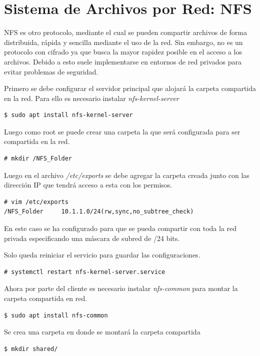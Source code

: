 \documentclass[12pt]{article}
\begin{document}
\section{Sistema de Archivos por Red: NFS}

NFS es otro protocolo, mediante el cual se pueden compartir archivos de forma distribuida, rápida y sencilla mediante el uso de la red. Sin embargo, no es un protocolo con cifrado ya que busca la mayor rapidez posible en el acceso a los archivos. Debido a esto suele implementarse en entornos de red privados para evitar problemas de seguridad. \cite{nfs}


Primero se debe configurar el servidor principal que alojará la carpeta compartida en la red. Para ello es necesario instalar \emph{nfs-kernel-server}

\begin{lstlisting}[frame=single]
$ sudo apt install nfs-kernel-server
\end{lstlisting}

Luego como root se puede crear una carpeta la que será configurada para ser compartida en la red.
\begin{lstlisting}[frame=single]
# mkdir /NFS_Folder
\end{lstlisting}

Luego en el archivo \emph{/etc/exports} se debe agregar la carpeta creada junto con las dirección IP que tendrá acceso a esta con los permisos. 
\begin{lstlisting}[frame=single]
# vim /etc/exports
/NFS_Folder		10.1.1.0/24(rw,sync,no_subtree_check)
\end{lstlisting}
En este caso se ha configurado para que se pueda compartir con toda la red privada especificando una máscara de subred de /24 bits.

Solo queda reiniciar el servicio para guardar las configuraciones.
\begin{lstlisting}[frame=single]
# systemctl restart nfs-kernel-server.service
\end{lstlisting}

Ahora por parte del cliente es necesario instalar \emph{nfs-common} para montar la carpeta compartida en red.
\begin{lstlisting}[frame=single]
$ sudo apt install nfs-common
\end{lstlisting}

Se crea una carpeta en donde se montará la carpeta compartida
\begin{lstlisting}[frame=single]
$ mkdir shared/
\end{lstlisting}
\end{document}
